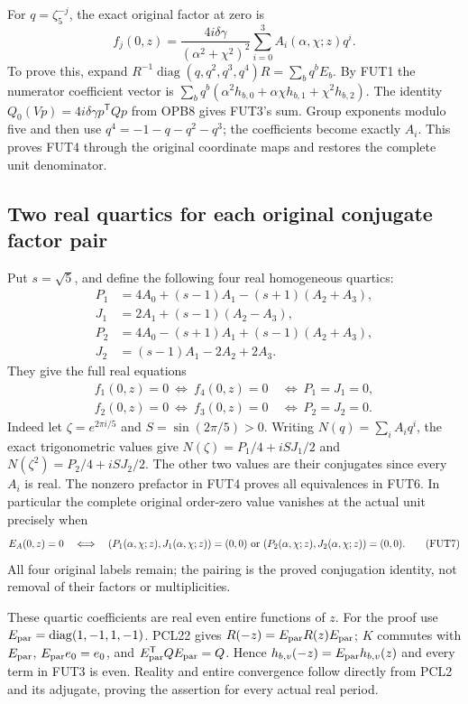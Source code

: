 For $q=\zeta_5^{-j}$, the exact original factor at zero is
\[
 \boxed{\quad
 f_j(0,z)=\frac{4i\delta\gamma}{(\alpha^2+\chi^2)^2}
          \sum_{i=0}^3A_i(\alpha,\chi;z)q^i.
 \quad}\tag{FUT4}
\]
To prove this, expand
$R^{-1}\operatorname{diag}(q,q^2,q^3,q^4)R=\sum_bq^bE_b$.
By FUT1 the numerator coefficient vector is
$\sum_bq^b(\alpha^2h_{b,0}+\alpha\chi h_{b,1}+\chi^2h_{b,2})$.
The identity $Q_0(Vp)=4i\delta\gamma p^{\mathsf T}Qp$ from OPB8
gives FUT3's sum. Group exponents modulo five and then use
$q^4=-1-q-q^2-q^3$; the coefficients become exactly $A_i$.
This proves FUT4 through the original coordinate maps and restores
the complete unit denominator.

\subsection{Two real quartics for each original conjugate factor pair}
Put $s=\sqrt5$, and define the following four real homogeneous quartics:
\[
 \begin{split}
 P_1&=4A_0+(s-1)A_1-(s+1)(A_2+A_3),\\
 J_1&=2A_1+(s-1)(A_2-A_3),\\
 P_2&=4A_0-(s+1)A_1+(s-1)(A_2+A_3),\\
 J_2&=(s-1)A_1-2A_2+2A_3.
 \end{split}\tag{FUT5}
\]
They give the full real equations
\[
 \begin{split}
 f_1(0,z)=0\ \Longleftrightarrow\ f_4(0,z)=0
       &\ \Longleftrightarrow\ P_1=J_1=0,\\
 f_2(0,z)=0\ \Longleftrightarrow\ f_3(0,z)=0
       &\ \Longleftrightarrow\ P_2=J_2=0.
 \end{split}\tag{FUT6}
\]
Indeed let $\zeta=e^{2\pi i/5}$ and $S=\sin(2\pi/5)>0$.
Writing $N(q)=\sum_iA_iq^i$, the exact trigonometric values give
$N(\zeta)=P_1/4+iSJ_1/2$ and
$N(\zeta^2)=P_2/4+iSJ_2/2$.
The other two values are their conjugates since every $A_i$ is real.
The nonzero prefactor in FUT4 proves all equivalences in FUT6.
In particular the complete original order-zero value vanishes at the
actual unit precisely when
\[
 E_A(0,z)=0
 \quad\Longleftrightarrow\quad
 (P_1(\alpha,\chi;z),J_1(\alpha,\chi;z))=(0,0)
 \ \hbox{or}\ 
 (P_2(\alpha,\chi;z),J_2(\alpha,\chi;z))=(0,0).
 \tag{FUT7}
\]
All four original labels remain; the pairing is the proved conjugation
identity, not removal of their factors or multiplicities.

These quartic coefficients are real even entire functions of $z$.
For the proof use $E_{\rm par}=\operatorname{diag}(1,-1,1,-1)$.
PCL22 gives $R(-z)=E_{\rm par}R(z)E_{\rm par}$;
$K$ commutes with $E_{\rm par}$, $E_{\rm par}e_0=e_0$, and
$E_{\rm par}^{\mathsf T}QE_{\rm par}=Q$.
Hence $h_{b,v}(-z)=E_{\rm par}h_{b,v}(z)$ and every term in FUT3
is even. Reality and entire convergence follow directly from PCL2
and its adjugate, proving the assertion for every actual real period.

